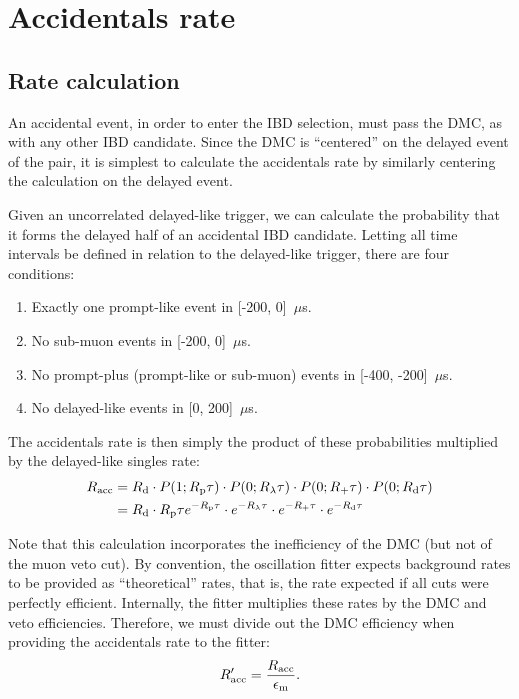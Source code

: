 \documentclass[../thesis.tex]{subfiles}
\begin{document}
\section{Accidentals rate}
\label{sec:accratecalc}

\subsection{Rate calculation}
\label{sec:accRateCalc}

An accidental event, in order to enter the IBD selection, must pass the DMC, as
with any other IBD candidate. Since the DMC is ``centered'' on the delayed event
of the pair, it is simplest to calculate the accidentals rate by similarly
centering the calculation on the delayed event.

Given an uncorrelated delayed-like trigger, we can calculate the probability
that it forms the delayed half of an accidental IBD candidate. Letting all time
intervals be defined in relation to the delayed-like trigger, there are four
conditions:
\begin{enumerate}
\item Exactly one prompt-like event in [-200, 0]~$\mu$s.
\item No sub-muon events in [-200, 0]~$\mu$s.
\item No prompt-plus (prompt-like or sub-muon) events in [-400, -200]~$\mu$s.
\item No delayed-like events in [0, 200]~$\mu$s.
\end{enumerate}
The accidentals rate is then simply the product of these probabilities multiplied by the delayed-like singles rate:
\begin{align}
  \label{eq:accRate}
  R_\mathrm{acc} &= R_\mathrm{d} \cdot P(1; R_\mathrm{p} \tau)\cdot P(0; R_\mathrm{\lambda} \tau)
           \cdot P(0; R_\mathrm{+} \tau)\cdot P(0; R_\mathrm{d} \tau) \nonumber \\
        &= R_\mathrm{d}\cdot R_\mathrm{p}\tau e^{-R_\mathrm{p}\tau}\cdot e^{-R_\mathrm{\lambda}\tau}
           \cdot e^{-R_\mathrm{+}\tau} \cdot e^{-R_\mathrm{d}\tau}
\end{align}

Note that this calculation incorporates the inefficiency of the DMC (but not of
the muon veto cut). By convention, the oscillation fitter expects background
rates to be provided as ``theoretical'' rates, that is, the rate expected if all
cuts were perfectly efficient. Internally, the fitter multiplies these rates by
the DMC and veto efficiencies. Therefore, we must divide out the DMC efficiency
when providing the accidentals rate to the fitter:
\begin{equation}
  R_\mathrm{acc}' = \frac{R_\mathrm{acc}}{\epsilon_\mathrm{m}}.
\end{equation}
\end{document}
